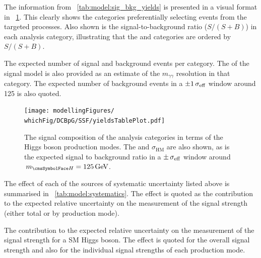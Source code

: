 The information from \Table~\ref{tab:model:sig_bkg_yields} is presented in a visual format in \Fig~\ref{fig:model:sig_table_visualisation}. This clearly shows the categories preferentially selecting events from the targeted processes. Also shown is the signal-to-background ratio ($S/(S+B)$) in each analysis category, illustrating that the \Untagged and \VBFTag categories are ordered by $S/(S+B)$. 

 \begin{table}
 \resizebox{\textwidth}{!}{

}
 \caption{ The expected number of signal and background events per category. The \effSigma of the signal model is also provided as an estimate of the $m_{\gamma\gamma}$ resolution in that category. The expected number of background events in a $\pm 1 \,\sigma_{\text{eff}}$ window around 125 \GeV is also quoted.}
 \label{tab:model:sig_bkg_yields}
\end{table}

\begin{figure}
 \begin{center}
 \texttt{[image: modellingFigures/\\whichFig/DCBpG/SSF/yieldsTablePlot.pdf]}
 \caption{The signal composition of the analysis categories in terms of the Higgs boson production modes. The \effSigma and $\sigma_{\text{HM}}$ are also shown, as is the expected signal to background ratio in a $\pm \,\sigma_{\text{eff}}$ window around $\mH=125\GeV$.} 
 \label{fig:model:sig_table_visualisation}
 \end{center}
\end{figure}

The effect of each of the sources of systematic uncertainty listed above is summarised in \Table~\ref{tab:model:systematics}. The effect is quoted as the contribution to the expected relative uncertainty on the measurement of the signal strength (either total or by production mode). 

 \begin{table}[b]
 \resizebox{\textwidth}{!}{

}
 \caption{ The contribution to the expected relative uncertainty on the measurement of the signal strength for a SM Higgs boson. The effect is quoted for the overall signal strength and also for the individual signal strengths of each production mode.}
 \label{tab:model:systematics}
\end{table}
